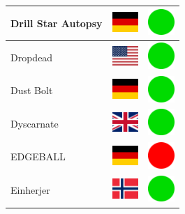\documentclass[12pt, a4paper, twoside]{report}
\begin{document}
\begin{center}
\begin{longtable}{|p{5cm}|p{2cm}|p{2cm}|}
Drill Star Autopsy & \includegraphics[width=1cm]{4x3/de} & \includegraphics[width=1cm]{likes/y} \\ \hline
Dropdead & \includegraphics[width=1cm]{4x3/us} & \includegraphics[width=1cm]{likes/y} \\ \hline
Dust Bolt & \includegraphics[width=1cm]{4x3/de} & \includegraphics[width=1cm]{likes/y} \\ \hline
Dyscarnate & \includegraphics[width=1cm]{4x3/gb} & \includegraphics[width=1cm]{likes/y} \\ \hline
EDGEBALL & \includegraphics[width=1cm]{4x3/de} & \includegraphics[width=1cm]{likes/n} \\ \hline
Einherjer & \includegraphics[width=1cm]{4x3/no} & \includegraphics[width=1cm]{likes/y} \\ \hline

\end{longtable}
\end{center}
\end{document}
